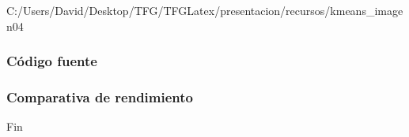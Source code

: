 \documentclass{beamer}
\begin{document}

\begin{frame} %
  {C:/Users/David/Desktop/TFG/TFGLatex/presentacion/recursos/kmeans_imagen}{0}{4}
\end{frame}


\begin{frame}[fragile] %
\frametitle{Código fuente}
%
\end{frame}


\begin{frame} %
\frametitle{Comparativa de rendimiento}

\end{frame}


\begin{frame}
\Huge{\centerline{Fin}}
\end{frame}

\end{document}
